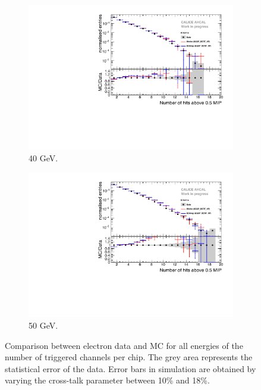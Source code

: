 \begin{figure}[t]
\begin{subfigure}[t]{0.45\textwidth}
		\includegraphics[width=1\textwidth]{chap5/fig_AHCAL_timing/Electrons/Comparison_SimData_Electrons_nHits_40GeV.pdf}
		\caption{40 GeV.}\label{fig:elec_sim_data_nHits_40GeV}
	\end{subfigure}
	\hfill
	\begin{subfigure}[t]{0.45\textwidth}
		\centering
		\includegraphics[width=1\textwidth]{chap5/fig_AHCAL_timing/Electrons/Comparison_SimData_Electrons_nHits_50GeV.pdf}
		\caption{50 GeV.}\label{fig:elec_sim_data_nHits_50GeV}
	\end{subfigure}
	\caption{Comparison between electron data and MC for all energies of the number of triggered channels per chip. The grey area represents the statistical error of the data. Error bars in simulation are obtained by varying the cross-talk parameter between 10\% and 18\%.}
	\label{fig:sim_data_elec_nHits}
\end{figure}


